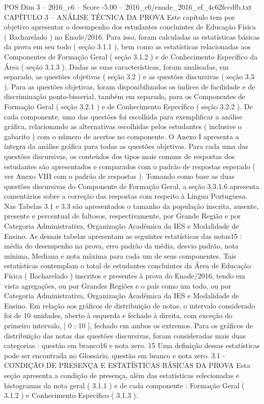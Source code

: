 \begin{textsample}{POS Dim 3 – 2016\_c6 – Score -5.00 – 2016\_c6/enade\_2016\_ef\_4c62fccdfb.txt}  \label{ex:f3_pos_254}
CAPÍTULO 3 – ANÁLISE TÉCNICA DA PROVA Este capítulo tem por objetivo apresentar o desempenho dos estudantes concluintes de Educação Física ( Bacharelado ) no Enade/2016.
Para isso, foram calculadas as estatísticas básicas da prova em seu todo ( seção 3.1.1 ), bem como as estatísticas relacionadas aos Componentes de Formação Geral ( seção 3.1.2 ) e de Conhecimento Específico da Área ( seção 3.1.3 ).
Dadas as suas características, foram analisadas, em separado, as questões objetivas ( seção 3.2 ) e as questões discursivas ( seção 3.3 ).
Para as questões objetivas, foram disponibilizados os índices de facilidade e de discriminação ponto-bisserial, também em separado, para os Componentes de Formação Geral ( seção 3.2.1 ) e de Conhecimento Específico ( seção 3.2.2 ).
De cada componente, uma das questões foi escolhida para exemplificar a análise gráfica, relacionando as alternativas escolhidas pelos estudantes ( inclusive o gabarito ) com o número de acertos no componente.
O Anexo I apresenta a íntegra da análise gráfica para todas as questões objetivas.
Para cada uma das questões discursivas, os conteúdos dos tipos mais comuns de respostas dos estudantes são apresentados e comparados com o padrão de respostas esperado ( ver Anexo VIII com o padrão de respostas ).
Tomando como base as duas questões discursivas do Componente de Formação Geral, a seção 3.3.1.6 apresenta comentários sobre a correção das respostas com respeito à Língua Portuguesa.
Nas Tabelas 3.1 e 3.3 são apresentados o tamanho da população inscrita, ausente, presente e percentual de faltosos, respectivamente, por Grande Região e por Categoria Administrativa, Organização Acadêmica da IES e Modalidade de Ensino.
As demais tabelas apresentam as seguintes estatísticas das notas15 : média do desempenho na prova, erro padrão da média, desvio padrão, nota mínima, Mediana e nota máxima para cada um de seus componentes.
Tais estatísticas contemplam o total de estudantes concluintes da Área de Educação Física ( Bacharelado ) inscritos e presentes à prova do Enade/2016, tendo em vista agregações, ou por Grandes Regiões e o país como um todo, ou por Categoria Administrativa, Organização Acadêmica da IES e Modalidade de Ensino.
Em relação aos gráficos de distribuição de notas, o intervalo considerado foi de 10 unidades, aberto à esquerda e fechado à direita, com exceção do primeiro intervalo, [ 0 ; 10 ], fechado em ambos os extremos.
Para os gráficos de distribuição das notas das questões discursivas, foram consideradas mais duas categorias : questão em branco16 e nota zero. 15 Uma definição dessas estatísticas pode ser encontrada no Glossário. questão em branco e nota zero. 3.1 - CONDIÇÃO DE PRESENÇA E ESTATÍSTICAS BÁSICAS DA PROVA Esta seção apresenta a condição de presença, além das estatísticas selecionadas e histogramas da nota geral ( 3.1.1 ) e de cada componente : Formação Geral ( 3.1.2 ) e Conhecimento Específico ( 3.1.3 ).

\end{textsample}
